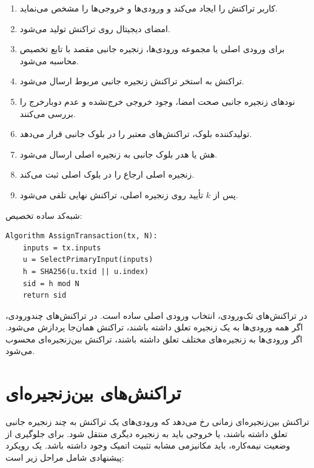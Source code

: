\begin{enumerate}
\item کاربر تراکنش را ایجاد می‌کند و ورودی‌ها و خروجی‌ها را مشخص می‌نماید.
\item امضای دیجیتال روی تراکنش تولید می‌شود.
\item برای ورودی اصلی یا مجموعه ورودی‌ها، زنجیره جانبی مقصد با تابع تخصیص محاسبه می‌شود.
\item تراکنش به استخر تراکنش زنجیره جانبی مربوط ارسال می‌شود.
\item نودهای زنجیره جانبی صحت امضا، وجود خروجی خرج‌نشده و عدم دوبارخرج را بررسی می‌کنند.
\item تولیدکننده بلوک، تراکنش‌های معتبر را در بلوک جانبی قرار می‌دهد.
\item هش یا هدر بلوک جانبی به زنجیره اصلی ارسال می‌شود.
\item زنجیره اصلی ارجاع را در بلوک اصلی ثبت می‌کند.
\item پس از \(k\) تأیید روی زنجیره اصلی، تراکنش نهایی تلقی می‌شود.
\end{enumerate}

شبه‌کد ساده تخصیص:

\begin{latin}
\begin{lstlisting}[basicstyle=\ttfamily\footnotesize]
Algorithm AssignTransaction(tx, N):
    inputs = tx.inputs
    u = SelectPrimaryInput(inputs)
    h = SHA256(u.txid || u.index)
    sid = h mod N
    return sid
\end{lstlisting}
\end{latin}

در تراکنش‌های تک‌ورودی، انتخاب ورودی اصلی ساده است. در تراکنش‌های چندورودی، اگر همه ورودی‌ها به یک زنجیره تعلق داشته باشند، تراکنش همان‌جا پردازش می‌شود. اگر ورودی‌ها به زنجیره‌های مختلف تعلق داشته باشند، تراکنش بین‌زنجیره‌ای محسوب می‌شود.

\section{تراکنش‌های بین‌زنجیره‌ای}

تراکنش بین‌زنجیره‌ای زمانی رخ می‌دهد که ورودی‌های یک تراکنش به چند زنجیره جانبی تعلق داشته باشند، یا خروجی باید به زنجیره دیگری منتقل شود. برای جلوگیری از وضعیت نیمه‌کاره، باید مکانیزمی مشابه تثبیت اتمیک وجود داشته باشد. یک رویکرد پیشنهادی شامل مراحل زیر است:

